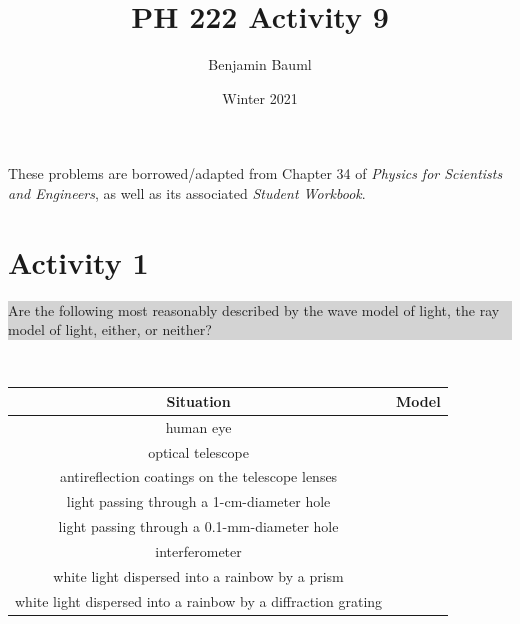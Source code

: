 \documentclass[]{article}
\title{PH 222 Activity 9}
\author{Benjamin Bauml}
\date{Winter 2021}
\newcommand{\excerpt}[1]{\colorbox{lightgray}{\parbox{14.8cm}{#1}} \\}
\begin{document}
\maketitle

\begin{center}
These problems are borrowed/adapted from Chapter 34 of \textit{Physics for Scientists and Engineers}, as well as its associated \textit{Student Workbook}.
\end{center}
\section*{Activity 1}%
\excerpt{
Are the following most reasonably described by the wave model of light, the ray model of light, either, or neither?
}
\begin{center}
	\begin{tabular}{c|c}
		Situation & Model \\
		\hline\hline
		human eye & \\
		\hline
		optical telescope & \\
		\hline
		antireflection coatings on the telescope lenses & \\
		\hline
		light passing through a 1-cm-diameter hole & \\
		\hline
		light passing through a 0.1-mm-diameter hole & \\
		\hline
		interferometer & \\
		\hline
		white light dispersed into a rainbow by a prism & \\
		\hline
		white light dispersed into a rainbow by a diffraction grating & \\
	\end{tabular}
\end{center}

\end{document}
